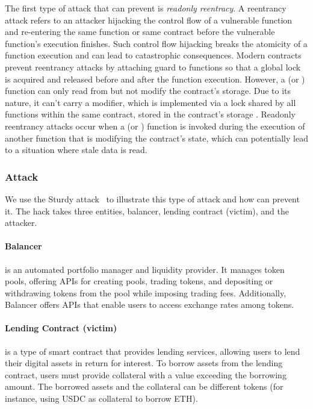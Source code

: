 The first type of attack that \lang can prevent is \textit{readonly reentracy}.
A reentrancy attack refers to an attacker hijacking the control flow of a vulnerable function and re-entering the same function or same contract before the vulnerable function's execution finishes.
Such control flow hijacking breaks the atomicity of a function execution and can lead to catastrophic consequences.
Modern contracts prevent reentrancy attacks by attaching  guard  to functions so that a global lock is acquired and released before and after the function execution.
However, a  (or ) function can only read from but not modify the contract's storage. 
Due to its nature, it can't carry a  modifier, which is implemented via a lock shared by all functions within the same contract, stored in the contract's storage . 
Readonly reentrancy attacks occur when a  (or ) function is invoked during the execution of another function that is modifying the contract's state, which can potentially lead to a situation where stale data is read.

\subsubsection{Attack} We use the Sturdy attack~\cite{sturbyHack} to illustrate this type of attack and how \lang can prevent it. The hack takes three entities, balancer, lending contract (victim), and the attacker.
\paragraph{Balancer} is an automated portfolio manager and liquidity provider. It manages token pools, offering APIs for creating pools, trading tokens, and depositing or withdrawing tokens from the pool while imposing trading fees. Additionally, Balancer offers APIs that enable users to access exchange rates among tokens. 
\paragraph{Lending Contract (victim)} is a type of smart contract that provides lending services, allowing users to lend their digital assets in return for interest. To borrow assets from the lending contract, users must provide collateral with a value exceeding the borrowing amount. The borrowed assets and the collateral can be different tokens (for instance, using USDC as collateral to borrow ETH).
